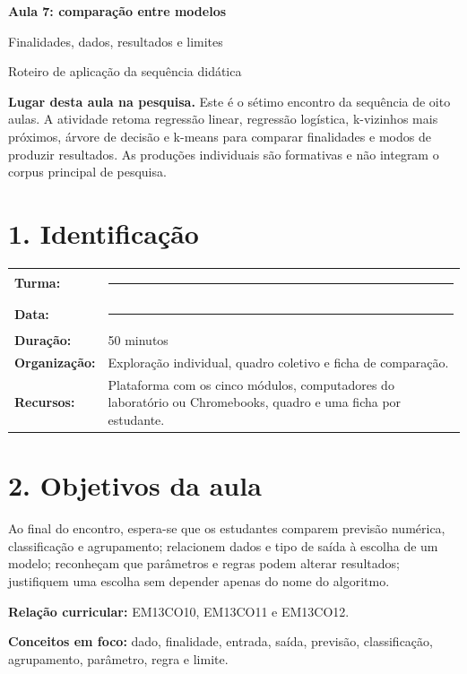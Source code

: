 \documentclass[12pt,a4paper]{article}
\newcommand{\bloco}[1]{%
  \vspace{0.25em}
  \noindent\colorbox{cinza}{\parbox{0.96\linewidth}{#1}}%
  \vspace{0.3em}
}
\begin{document}
\begin{center}
  {\LARGE\bfseries\color{azul} Aula 7: comparação entre modelos}\par
  \vspace{0.25em}
  {\large Finalidades, dados, resultados e limites}\par
  \vspace{0.35em}
  {\small Roteiro de aplicação da sequência didática}\par
\end{center}

\bloco{\textbf{Lugar desta aula na pesquisa.} Este é o sétimo encontro da sequência de oito aulas. A atividade retoma regressão linear, regressão logística, k-vizinhos mais próximos, árvore de decisão e k-means para comparar finalidades e modos de produzir resultados. As produções individuais são formativas e não integram o corpus principal de pesquisa.}

\section*{1. Identificação}

\begin{tabularx}{\linewidth}{@{}>{\bfseries}p{4.1cm}X@{}}
Turma: & \rule{8.5cm}{0.35pt} \\
Data: & \rule{8.5cm}{0.35pt} \\
Duração: & 50 minutos \\
Organização: & Exploração individual, quadro coletivo e ficha de comparação. \\
Recursos: & Plataforma com os cinco módulos, computadores do laboratório ou Chromebooks, quadro e uma ficha por estudante. \\
\end{tabularx}

\section*{2. Objetivos da aula}

Ao final do encontro, espera-se que os estudantes comparem previsão numérica, classificação e agrupamento; relacionem dados e tipo de saída à escolha de um modelo; reconheçam que parâmetros e regras podem alterar resultados; justifiquem uma escolha sem depender apenas do nome do algoritmo.

\textbf{Relação curricular:} EM13CO10, EM13CO11 e EM13CO12.

\textbf{Conceitos em foco:} dado, finalidade, entrada, saída, previsão, classificação, agrupamento, parâmetro, regra e limite.
\end{document}
